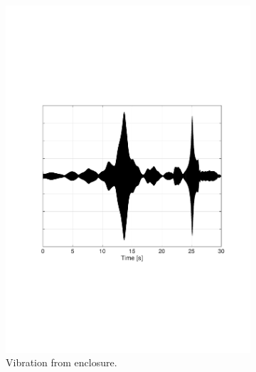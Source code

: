 \begin{figure}[H]
\begin{subfigure}[t]{0.3\textwidth}
	\includegraphics[width=1\textwidth]{figures/raw_enclosure1.pdf}
	\caption{Vibration from enclosure.}
	\label{fig:raw_enclosure1}
\end{subfigure}
\begin{subfigure}[t]{0.3\textwidth}

\end{subfigure}
\end{figure}
